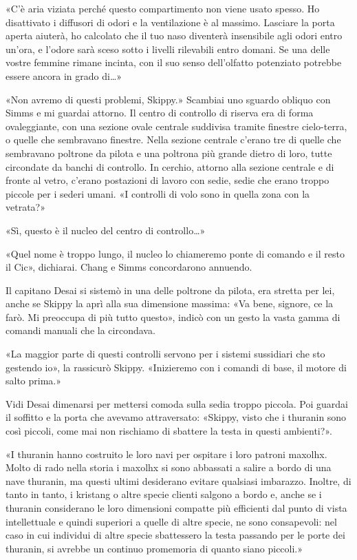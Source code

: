 «C'è aria viziata perché questo compartimento non viene usato spesso. Ho
disattivato i diffusori di odori e la ventilazione è al massimo.
Lasciare la porta aperta aiuterà, ho calcolato che il tuo naso diventerà
insensibile agli odori entro un'ora, e l'odore sarà sceso sotto i
livelli rilevabili entro domani. Se una delle vostre femmine rimane
incinta, con il suo senso dell'olfatto potenziato potrebbe essere ancora
in grado di\ldots»

«Non avremo di questi problemi, Skippy.» Scambiai uno sguardo obliquo
con Simms e mi guardai attorno. Il centro di controllo di riserva era di
forma ovaleggiante, con una sezione ovale centrale suddivisa tramite
finestre cielo-terra, o quelle che sembravano finestre. Nella sezione
centrale c'erano tre di quelle che sembravano poltrone da pilota e una
poltrona più grande dietro di loro, tutte circondate da banchi di
controllo. In cerchio, attorno alla sezione centrale e di fronte al
vetro, c'erano postazioni di lavoro con sedie, sedie che erano troppo
piccole per i sederi umani. «I controlli di volo sono in quella zona con
la vetrata?»

«Sì, questo è il nucleo del centro di controllo\ldots»

«Quel nome è troppo lungo, il nucleo lo chiameremo ponte di comando e il
resto il Cic», dichiarai. Chang e Simms concordarono annuendo.

Il capitano Desai si sistemò in una delle poltrone da pilota, era
stretta per lei, anche se Skippy la aprì alla sua dimensione massima:
«Va bene, signore, ce la farò. Mi preoccupa di più tutto questo», indicò
con un gesto la vasta gamma di comandi manuali che la circondava.

«La maggior parte di questi controlli servono per i sistemi sussidiari
che sto gestendo io», la rassicurò Skippy. «Inizieremo con i comandi di
base, il motore di salto prima.»

Vidi Desai dimenarsi per mettersi comoda sulla sedia troppo piccola. Poi
guardai il soffitto e la porta che avevamo attraversato: «Skippy, visto
che i thuranin sono così piccoli, come mai non rischiamo di sbattere la
testa in questi ambienti?».

«I thuranin hanno costruito le loro navi per ospitare i loro patroni
maxolhx. Molto di rado nella storia i maxolhx si sono abbassati a salire
a bordo di una nave thuranin, ma questi ultimi desiderano evitare
qualsiasi imbarazzo. Inoltre, di tanto in tanto, i kristang o altre
specie clienti salgono a bordo e, anche se i thuranin considerano le
loro dimensioni compatte più efficienti dal punto di vista intellettuale
e quindi superiori a quelle di altre specie, ne sono consapevoli: nel
caso in cui individui di altre specie sbattessero la testa passando per
le porte dei thuranin, si avrebbe un continuo promemoria di quanto siano
piccoli.»

